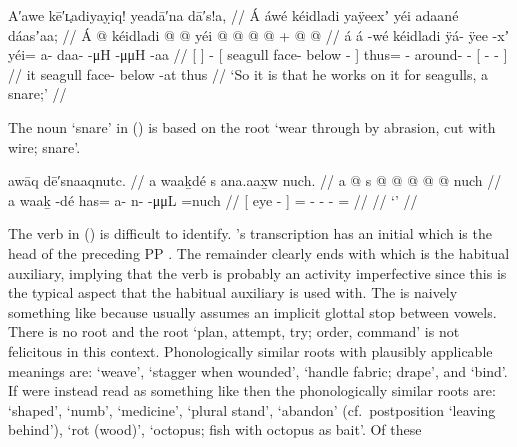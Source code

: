 \ex\label{ex:099-5-works-on-snare}%
%
\begingl
	\glpreamble	A′awe kē′ʟ̣adiyaỵiq! yeadā′na dā′s!a, //
	\glpreamble	Á áwé kéidladi yaÿeexʼ yéi adaané dáasʼaa; //
	\gla	{} Á {}  @ {}
		{} kéidladi  @ {} @ {} {}
		yéi @  @ {} @ {} @ {} +
		{}  @ {} @ {} {} //
	\glb	{} á {} á -wé
		{} kéidladi ÿá- ÿee -xʼ {}
		yéi= a- daa-  -μH
		{}  -μμH -aa {} //
	\glc	{}[  {}]  -
		{}[ seagull face- below - {}]
		thus= - around-  -
		{}[  - - {}] //
	\gld	{} it {}  {}
		{} seagull face- below -at {}
		thus\•  {} {} {}
		{}  {} {} {} //
	\glft	‘So it is that he works on it for seagulls, a snare;’
		//
\endgl
\xe

The noun  ‘snare’ in (\lastx) is based on the root  ‘wear through by abrasion, cut with wire; snare’.


\ex\label{ex:099-6-}%
%
\begingl
	\glpreamble	awāq dē′snaaqnutc. //
	\glpreamble	a waaḵdé s ana.aax̱w nuch. //
	\gla	{} a  @ {} {}
		s @  @ {} @ {} @ {} @ \•nuch //
	\glb	{} a waaḵ -dé {}
		has= a- n-  -μμL =nuch //
	\glc	{}[  eye - {}]
		= - -  - = //
	\gld	 //
	\glft	‘’
		//
\endgl
\xe

The verb in (\lastx) is difficult to identify.
\citeauthor{swanton:1909}’s transcription  has an initial  which is the head of the preceding PP .
The remainder  clearly ends with  which is the habitual auxiliary, implying that the verb is probably an activity imperfective since this is the typical aspect that the habitual auxiliary is used with.
The  is naively something like  because \citeauthor{swanton:1909} usually assumes an implicit glottal stop between vowels.
There is no root  and the root  ‘plan, attempt, try; order, command’ is not felicitous in this context.
Phonologically similar roots with plausibly applicable meanings are:  ‘weave’,  ‘stagger when wounded’,  ‘handle fabric; drape’, and  ‘bind’.
If  were instead read as something like  then the phonologically similar roots are:  ‘shaped’,  ‘numb’,  ‘medicine’,  ‘plural stand’,  ‘abandon’ (cf.\ postposition  ‘leaving behind’),  ‘rot (wood)’,  ‘octopus; fish with octopus as bait’.
Of these 

